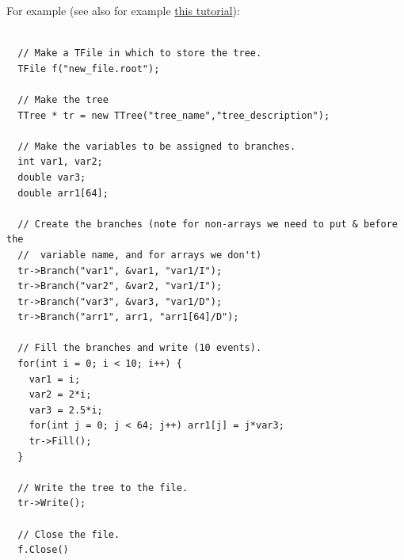 \documentclass[10pt]{article}
\begin{document}
\noindent For example (see also for example \href{https://root.cern.ch/root/html/tutorials/tree/tree2.C.html}{this tutorial}):
\begin{verbatim}

  // Make a TFile in which to store the tree.
  TFile f("new_file.root");
  
  // Make the tree
  TTree * tr = new TTree("tree_name","tree_description");
  
  // Make the variables to be assigned to branches.
  int var1, var2;
  double var3;
  double arr1[64];
  
  // Create the branches (note for non-arrays we need to put & before the 
  //  variable name, and for arrays we don't)
  tr->Branch("var1", &var1, "var1/I");
  tr->Branch("var2", &var2, "var1/I");
  tr->Branch("var3", &var3, "var1/D");
  tr->Branch("arr1", arr1, "arr1[64]/D");
  
  // Fill the branches and write (10 events).
  for(int i = 0; i < 10; i++) {
    var1 = i;
    var2 = 2*i;
    var3 = 2.5*i;
    for(int j = 0; j < 64; j++) arr1[j] = j*var3;
    tr->Fill();
  }
  
  // Write the tree to the file.
  tr->Write();
  
  // Close the file.
  f.Close()
\end{verbatim}

%
\end{document}
